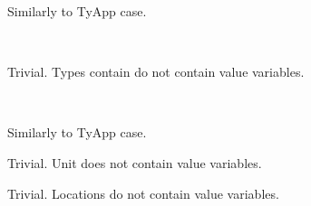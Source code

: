 \begin{flushleft}
Similarly to TyApp case.
\bigskip


 \\

Trivial. Types contain do not contain value variables.
\bigskip


 \\

Similarly to TyApp case.
\bigskip


Trivial. Unit does not contain value variables. 

\bigskip


Trivial. Locations do not contain value variables.


\end{flushleft}
